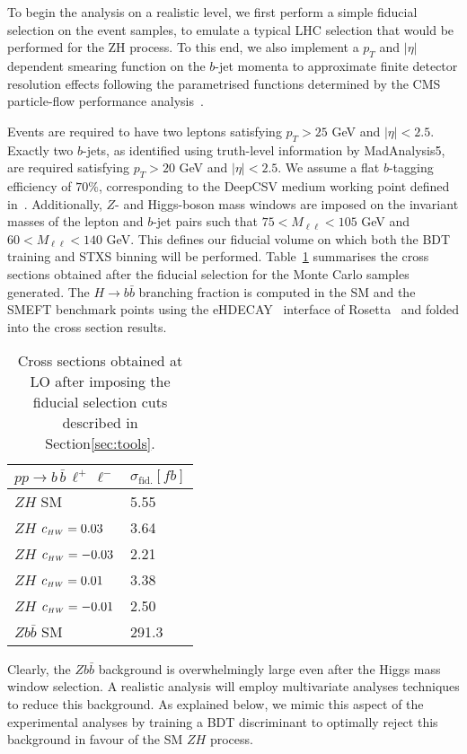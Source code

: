 To begin the analysis on a realistic level, we first perform a simple fiducial selection on the event samples, to emulate a typical LHC selection that would be performed for the ZH process. To this end, we also implement a $p_T$ and $|\eta|$ dependent smearing function on the $b$-jet momenta to approximate finite detector resolution effects following the parametrised functions determined by the CMS particle-flow performance analysis~\cite{Sirunyan:2017ulk}.

Events are required to have two leptons satisfying $p_T > 25$ GeV and $|\eta|< 2.5$. Exactly two $b$-jets, as identified using truth-level information by {\sc MadAnalysis5}, are required satisfying $p_T > 20$ GeV and $|\eta|< 2.5$. We assume a flat $b$-tagging efficiency of $70\%$, corresponding to the DeepCSV medium working point defined in~\cite{Sirunyan:2017ezt}. Additionally, $Z$- and Higgs-boson mass windows are imposed on the invariant masses of the lepton and $b$-jet pairs such that $75 < M_{\ell\ell} < 105$ GeV and  $60 < M_{\ell\ell} < 140$ GeV. This defines our fiducial volume on which both the BDT training and STXS binning will be performed. Table~\ref{tab:FiducialXS} summarises the cross sections obtained after the fiducial selection for the Monte Carlo samples generated. The $H\to b\bar{b}$ branching fraction is computed in the SM and the SMEFT benchmark points using the e{\sc HDECAY}~\cite{Contino:2014aaa} interface of {\sc Rosetta}~\cite{Falkowski:2015wza} and folded into the cross section results.
\begin{table}
    \centering
    \begin{tabular}{|l|l|}
        \hline
        $pp\to b\,\bar{b}\,\ell^+\,\ell^-$& $\sigma_{\text{fid.}} [fb]$\tabularnewline
        \hline
        $ZH$ SM&5.55\tabularnewline
        $ZH$ $c_{\scriptscriptstyle HW} = 0.03$&3.64\tabularnewline
        $ZH$ $c_{\scriptscriptstyle HW} = -0.03$&2.21\tabularnewline
        $ZH$ $c_{\scriptscriptstyle HW} = 0.01$&3.38\tabularnewline
        $ZH$ $c_{\scriptscriptstyle HW} = -0.01$&2.50\tabularnewline
        $Z b\bar{b}$ SM&291.3\tabularnewline
        \hline
    \end{tabular}
    \caption{\label{tab:FiducialXS} Cross sections obtained at LO after imposing the fiducial selection cuts described in Section\ref{sec:tools}.}
\end{table}
Clearly, the $Z b\bar{b}$ background is overwhelmingly large even after the Higgs mass
window selection. A realistic analysis will employ multivariate analyses techniques to
reduce this background. As explained below, we mimic this aspect of the
experimental analyses by training a BDT discriminant to optimally reject this background
in favour of the SM $ZH$ process.

